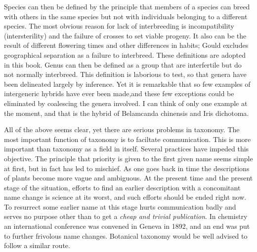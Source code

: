 Species can then be defined by the principle that members of a species can
breed with others in the same species but not with individuals belonging to a different
species. The most obvious reason for lack of interbreeding is incompatibility
(intersterility) and the failure of crosses to set viable progeny. It also can be the result
of different flowering times and other differences in habits; Gould excludes
geographical separation as a failure to interbreed. These definitions are adopted in
this book. Genus can then be defined as a group that are interfertile but do not
normally interbreed. This definition is laborious to test, so that genera have been
delineated largely by inference. Yet it is remarkable that so few examples of
intergeneric hybrids have ever been made,and these few exceptions could be
eliminated by coalescing the genera involved. I can think of only one example at the
moment, and that is the hybrid of Belamcanda chinensis and Iris dichotoma.

All of the above seems clear, yet there are serious problems in taxonomy. The
most important function of taxonomy is to faciltate communication. This is more
important than taxonomy as a field in itself. Several practices have impeded this
objective. The principle that priority is given to the first given name seems simple at
first, but in fact has led to mischief. As one goes back in time the descriptions of plants
become more vague and ambiguous. At the present time and the present stage of the
situation, efforts to find an earlier description with a concomitant name change is
science at its worst, and such efforts should be ended right now. To resurrect some
earlier name at this stage hurts communication badly and serves no purpose other
than to get a \textit{cheap and trivial publication}. In chemistry an international conference
was convened in Geneva in 1892, and an end was put to further frivolous name
changes. Botanical taxonomy would be well advised to follow a similar route.

